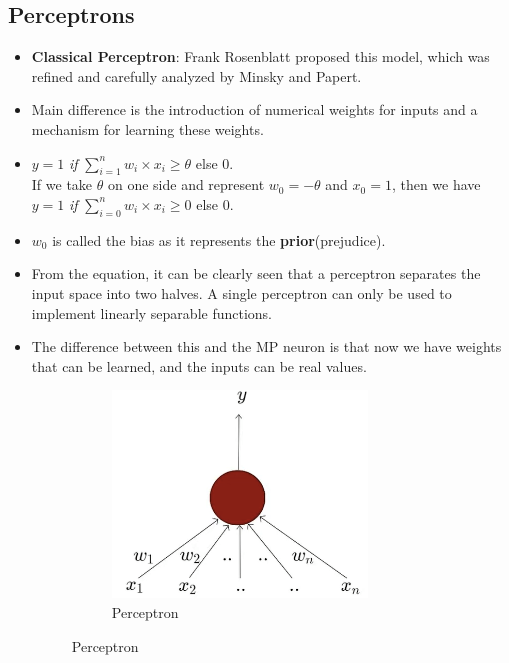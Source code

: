 \documentclass[a4paper]{article}
\begin{document}
\subsection{Perceptrons}
\begin{itemize}
    \item \textbf{Classical Perceptron}: Frank Rosenblatt proposed this model, which was refined and carefully analyzed by Minsky and Papert.
    \item Main difference is the introduction of numerical weights for inputs and a mechanism for learning these weights.
    \item $y=1$ \textit{if} $\sum_{i=1}^nw_i\times x_i \geq \theta$ else $0$.\\
    If we take $\theta$ on one side and represent $w_0=-\theta$ and $x_0=1$, then we have\\
    $y=1$ \textit{if} $\sum_{i=0}^nw_i\times x_i\geq 0$ else $0$.
    \item $w_0$ is called the bias as it represents the \textbf{prior}(prejudice).
    \item From the equation, it can be clearly seen that a perceptron separates the input space into two halves. A single perceptron can only be used to implement linearly separable functions.
    \item The difference between this and the MP neuron is that now we have weights that can be learned, and the inputs can be real values.
    \begin{figure}[H]
        \centering
        \begin{subfigure}[b]{0.45\textwidth}
            \includegraphics[width=0.8\textwidth]{Degree//static/DL_classical_perceptron.png}
            \caption{Perceptron}
            \label{fig:DL-perceptron}

\end{subfigure}
\end{figure}
\end{itemize}
\end{document}
